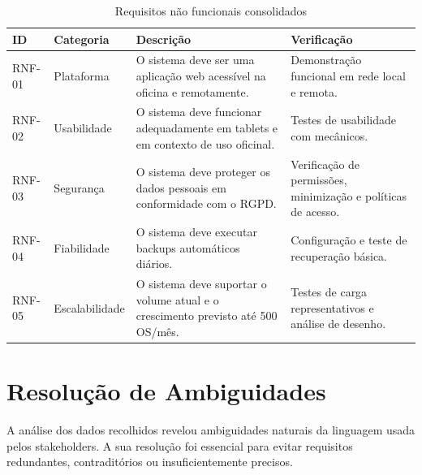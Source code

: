 \documentclass[a4paper,12pt]{scrreprt}
\begin{document}
        \begin{table}[H]
            \centering
            \small
            \begin{tabular}{|p{1.6cm}|p{3cm}|p{7.4cm}|p{3.2cm}|}
                \hline
                \rowcolor{gray!20!white}
                \textbf{ID} & \textbf{Categoria} & \textbf{Descrição} & \textbf{Verificação} \\
                \hline
                RNF-01 & Plataforma & O sistema deve ser uma aplicação web acessível na oficina e remotamente. & Demonstração funcional em rede local e remota. \\
                \hline
                RNF-02 & Usabilidade & O sistema deve funcionar adequadamente em tablets e em contexto de uso oficinal. & Testes de usabilidade com mecânicos. \\
                \hline
                RNF-03 & Segurança & O sistema deve proteger os dados pessoais em conformidade com o RGPD. & Verificação de permissões, minimização e políticas de acesso. \\
                \hline
                RNF-04 & Fiabilidade & O sistema deve executar backups automáticos diários. & Configuração e teste de recuperação básica. \\
                \hline
                RNF-05 & Escalabilidade & O sistema deve suportar o volume atual e o crescimento previsto até 500 OS/mês. & Testes de carga representativos e análise de desenho. \\
                \hline
            \end{tabular}
            \caption{Requisitos não funcionais consolidados}
        \end{table}

    \section{Resolução de Ambiguidades}
        A análise dos dados recolhidos revelou ambiguidades naturais da linguagem usada pelos stakeholders. A sua resolução foi essencial para evitar requisitos redundantes, contraditórios ou insuficientemente precisos.
\end{document}
